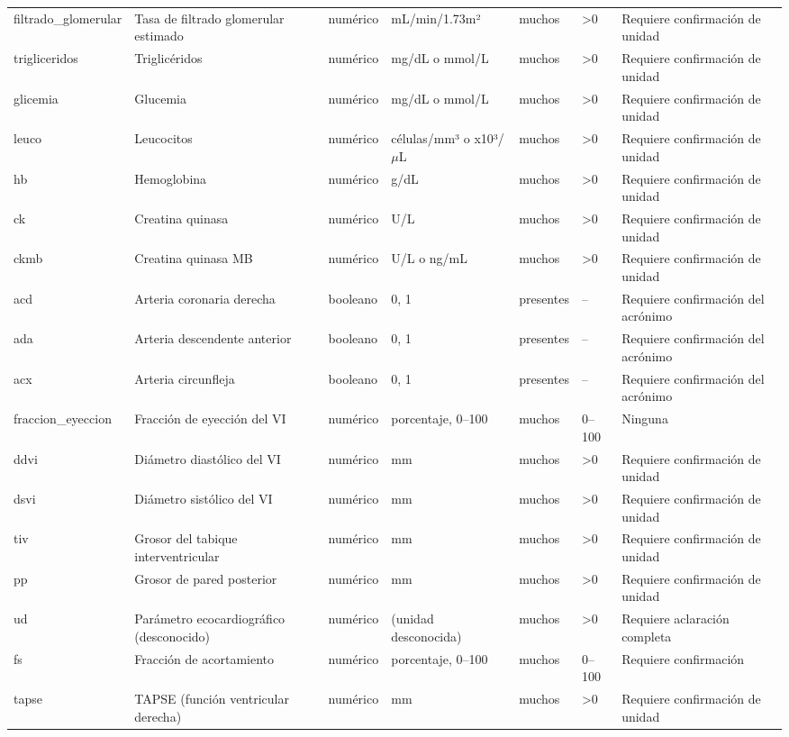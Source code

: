 \documentclass[11pt,a4paper]{article}
\begin{document}
\begin{longtable}{@{}L{0.095\textwidth} L{0.17\textwidth} L{0.07\textwidth} L{0.16\textwidth} L{0.14\textwidth} L{0.13\textwidth} L{0.15\textwidth}@{}}
filtrado\_glomerular & Tasa de filtrado glomerular estimado & numérico & mL/min/1.73m² & muchos & >0 & Requiere confirmación de unidad \\
trigliceridos & Triglicéridos & numérico & mg/dL o mmol/L & muchos & >0 & Requiere confirmación de unidad \\
glicemia & Glucemia & numérico & mg/dL o mmol/L & muchos & >0 & Requiere confirmación de unidad \\
leuco & Leucocitos & numérico & células/mm³ o x10³/$\mu$L & muchos & >0 & Requiere confirmación de unidad \\
hb & Hemoglobina & numérico & g/dL & muchos & >0 & Requiere confirmación de unidad \\
ck & Creatina quinasa & numérico & U/L & muchos & >0 & Requiere confirmación de unidad \\
ckmb & Creatina quinasa MB & numérico & U/L o ng/mL & muchos & >0 & Requiere confirmación de unidad \\
acd & Arteria coronaria derecha & booleano & 0, 1 & presentes & -- & Requiere confirmación del acrónimo \\
ada & Arteria descendente anterior & booleano & 0, 1 & presentes & -- & Requiere confirmación del acrónimo \\
acx & Arteria circunfleja & booleano & 0, 1 & presentes & -- & Requiere confirmación del acrónimo \\
fraccion\_eyeccion & Fracción de eyección del VI & numérico & porcentaje, 0--100 & muchos & 0--100 & Ninguna \\
ddvi & Diámetro diastólico del VI & numérico & mm & muchos & >0 & Requiere confirmación de unidad \\
dsvi & Diámetro sistólico del VI & numérico & mm & muchos & >0 & Requiere confirmación de unidad \\
tiv & Grosor del tabique interventricular & numérico & mm & muchos & >0 & Requiere confirmación de unidad \\
pp & Grosor de pared posterior & numérico & mm & muchos & >0 & Requiere confirmación de unidad \\
ud & Parámetro ecocardiográfico (desconocido) & numérico & (unidad desconocida) & muchos & >0 & Requiere aclaración completa \\
fs & Fracción de acortamiento & numérico & porcentaje, 0--100 & muchos & 0--100 & Requiere confirmación \\
tapse & TAPSE (función ventricular derecha) & numérico & mm & muchos & >0 & Requiere confirmación de unidad \\

\end{longtable}
\end{document}
